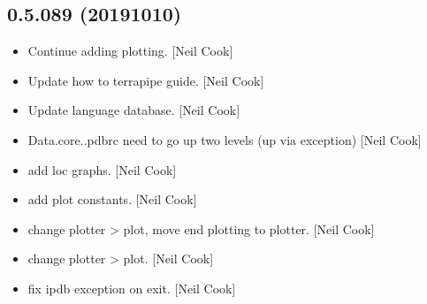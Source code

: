 \documentclass[a4paper,10pt,english]{report}
\begin{document}
\subsection{0.5.089 (2019\sphinxhyphen{}10\sphinxhyphen{}10)}
\label{\detokenize{misc/changelog:id72}}\begin{itemize}
\item {} 
Continue adding plotting. {[}Neil Cook{]}

\item {} 
Update how to terrapipe guide. {[}Neil Cook{]}

\item {} 
Update language database. {[}Neil Cook{]}

\item {} 
Data.core..pdbrc \sphinxhyphen{} need to go up two levels (up via exception) {[}Neil
Cook{]}

\item {} 
 \sphinxhyphen{} add loc graphs. {[}Neil
Cook{]}

\item {} 
 \sphinxhyphen{} add plot constants. {[}Neil
Cook{]}

\item {} 
 \sphinxhyphen{} change plotter \textendash{}\textgreater{} plot, move end plotting
to plotter. {[}Neil Cook{]}

\item {} 
 \sphinxhyphen{} change plotter \textendash{}\textgreater{} plot. {[}Neil Cook{]}

\item {} 
 \sphinxhyphen{} fix ipdb exception on exit. {[}Neil
Cook{]}

\end{itemize}
\end{document}
